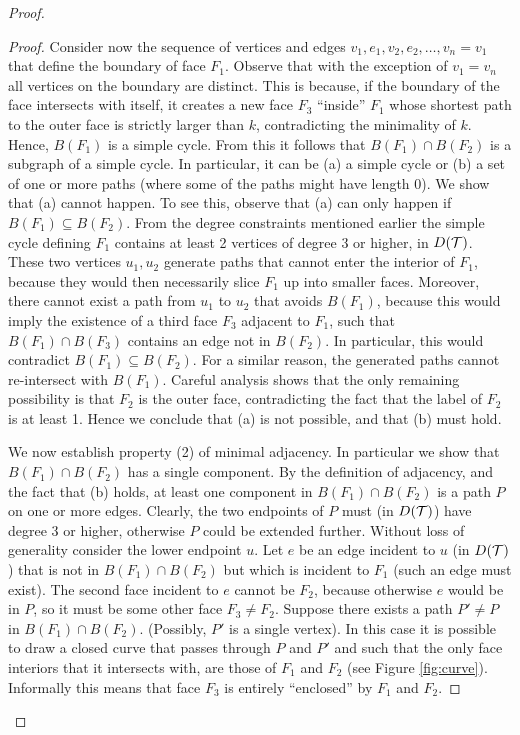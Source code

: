 \begin{proof}
\begin{proof}
Consider now the sequence of vertices and edges $v_1, e_1, v_2, e_2, \ldots, v_n = v_1$ that define the boundary of face $F_1$. Observe that with the exception of $v_1 = v_n$ all vertices on the boundary are distinct. This is because, if the boundary of the face intersects with itself, it creates a new face $F_3$ ``inside'' $F_1$ whose shortest path to the outer face is strictly larger than $k$, contradicting the minimality of $k$. Hence, $B(F_1)$ is a simple cycle. From this it follows that $B(F_1) \cap B(F_2)$ is a subgraph of a simple cycle. In particular, it can be (a) a simple cycle or (b) a set of one or more paths (where some of the paths might have length 0). We show that (a) cannot happen.  To see this, observe that (a) can only happen if $B(F_1) \subseteq B(F_2)$. From the degree constraints mentioned earlier the simple cycle defining $F_1$ contains at least 2 vertices of degree 3 or higher, in $D({\mathcal T})$. These two vertices $u_1, u_2$ generate paths that cannot enter the interior of $F_1$, because they would then necessarily slice $F_1$ up into smaller faces. Moreover, there cannot exist a path from $u_1$ to $u_2$ that avoids $B(F_1)$, because this would imply the existence of a third face $F_3$ adjacent to $F_1$, such that $B(F_1) \cap B(F_3)$ contains an edge not in $B(F_2)$. In particular, this would contradict $B(F_1) \subseteq B(F_2)$.  For a similar reason, the generated paths cannot re-intersect with $B(F_1)$. Careful analysis shows that the only remaining possibility is that $F_2$ is the outer face, contradicting the fact that the label of $F_2$ is at least 1. Hence we conclude that (a) is not possible, and that (b) must hold.

We now establish property (2) of minimal adjacency. In particular we show that $B(F_1) \cap B(F_2)$ has a single component. By the definition of adjacency, and the fact that (b) holds, at least one component in $B(F_1) \cap B(F_2)$ is a path $P$ on one or more edges. Clearly, the two endpoints of $P$ must (in $D({\mathcal T})$) have degree 3 or higher, otherwise $P$ could be extended further. Without loss of generality consider the lower endpoint $u$. Let $e$ be an edge incident to $u$ (in $D({\mathcal T})$) that is not in $B(F_1) \cap B(F_2)$ but which is incident to $F_1$ (such an edge must exist). The second face incident to $e$ cannot be $F_2$, because otherwise $e$ would be in $P$, so it must be some other face $F_3 \neq F_2$. Suppose there exists a path $P' \neq P$ in $B(F_1) \cap B(F_2)$. (Possibly, $P'$ is a single vertex). In this case it is possible to draw a closed curve that passes through $P$ and $P'$ and such that the only face interiors that it intersects with, are those of $F_1$ and $F_2$ (see Figure \ref{fig:curve}). Informally this means that face $F_3$ is entirely ``enclosed'' by $F_1$ and $F_2$.


\end{proof}
\end{proof}

